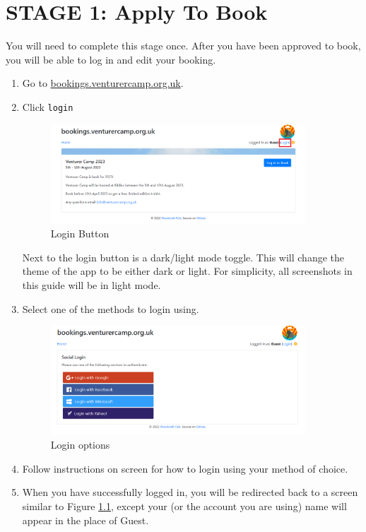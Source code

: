 \chapter{STAGE 1: Apply To Book}

You will need to complete this stage once. After you have been approved to book, you will be able to log in and edit your booking.

\begin{enumerate}
    \item Go to \href{https://bookings.venturercamp.org.uk/}{bookings.venturercamp.org.uk}.
    \item Click \verb|login|
    \begin{figure}[H]
        \centering
        \includegraphics[width=0.9\textwidth]{assets/login.png}
        \caption{Login Button}
        \label{fig:login}
    \end{figure}
    Next to the login button is a dark/light mode toggle. This will change the theme of the app to be either dark or light. For simplicity, all screenshots in this guide will be in light mode.
    \item Select one of the methods to login using. 
    \begin{figure}[H]
        \centering
        \includegraphics[width=0.9\textwidth]{assets/login-using.png}
        \caption{Login options}
    \end{figure}
    \item Follow instructions on screen for how to login using your method of choice.
    \item When you have successfully logged in, you will be redirected back to a screen similar to Figure \ref*{fig:login}, except your (or the account you are using) name will appear in the place of Guest.

\end{enumerate}
